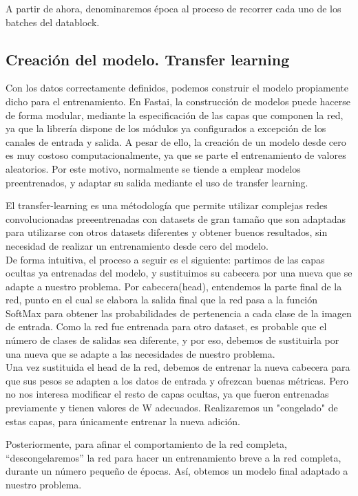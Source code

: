 A partir de ahora, denominaremos época al proceso de recorrer cada uno de los batches del datablock.

\subsection{Creación del modelo. Transfer learning}

Con los datos correctamente definidos, podemos construir el modelo propiamente dicho para el entrenamiento. En Fastai, la construcción de modelos puede hacerse de forma modular, mediante la especificación de las capas que componen la red, ya que la librería dispone de los módulos ya configurados a excepción de los canales de entrada y salida. A pesar de ello, la creación de un modelo desde cero es muy costoso computacionalmente, ya que se parte el entrenamiento de valores aleatorios. Por este motivo, normalmente se tiende a emplear modelos preentrenados, y adaptar su salida mediante el uso de transfer learning.

El transfer-learning es una métodología que permite utilizar complejas redes convolucionadas preeentrenadas con datasets de gran tamaño que son adaptadas para utilizarse con otros datasets diferentes y obtener buenos resultados, sin necesidad de realizar un entrenamiento desde cero del modelo.\\

De forma intuitiva, el proceso a seguir es el siguiente: partimos de las capas ocultas ya entrenadas del modelo, y sustituimos su cabecera por una nueva que se adapte a nuestro problema. Por cabecera(head), entendemos la parte final de la red, punto en el cual se elabora la salida final que la red pasa a la función SoftMax para obtener las probabilidades de pertenencia a cada clase de la imagen de entrada. Como la red fue entrenada para otro dataset, es probable que el número de clases de salidas sea diferente, y por eso, debemos de sustituirla por una nueva que se adapte a las necesidades de nuestro problema.\\

Una vez sustituida el head de la red, debemos de entrenar la nueva cabecera para que sus pesos se adapten a los datos de entrada y ofrezcan buenas métricas. Pero no nos interesa modificar el resto de capas ocultas, ya que fueron entrenadas previamente y tienen valores de W adecuados. Realizaremos un "congelado" de estas capas, para únicamente entrenar la nueva adición.

Posteriormente, para afinar el comportamiento de la red completa, ``descongelaremos'' la red para hacer un entrenamiento breve a la red completa, durante un número pequeño de épocas. Así, obtemos un modelo final adaptado a nuestro problema.\\


